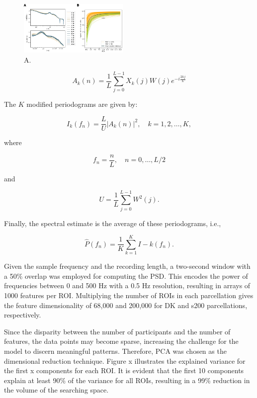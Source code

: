 \documentclass{cys}
\begin{document}
\begin{figure}[H]
\centering
	\includegraphics[width=0.47\textwidth]{PSD+PCA}
	\caption{A. }
	\label{CSD}
\end{figure}

\begin{equation}
A_k(n) = \frac{1}{L} \sum_{j=0}^{L-1}X_k(j)W(j)e^{-i{\frac{2kj}{L}}}
\end{equation} 


\smallskip
The $K$ modified periodograms are given by:

\begin{equation}
I_k(f_n)=\frac{L}{U}|A_k(n)|^2, \quad k=1,2,\ldots,K,
\end{equation} 

where

\begin{equation*}
f_n=\frac{n}{L}, \quad n=0,\ldots,L/2
\end{equation*}

and

\begin{equation*}
U=\frac{1}{L}\sum_{j=0}^{L-1} W^2(j).
\end{equation*}

\smallskip
Finally, the spectral estimate is the average of these periodograms, i.e., 


\begin{equation}
\hat{P}(f_n)=\frac{1}{K}\sum_{k=1}^K I-k(f_n).
\end{equation}


Given the sample frequency and the recording length, a two-second window with a 50\% overlap was employed for computing the PSD. This encodes the power of frequencies between 0 and 500 Hz with a 0.5 Hz resolution, resulting in arrays of 1000 features per ROI. Multiplying the number of ROIs in each parcellation gives the feature dimensionality of 68,000 and 200,000 for DK and s200 parcellations, respectively.


\bigskip
Since the disparity between the number of participants and the number of features, the data points may become sparse, increasing the challenge for the model to discern meaningful patterns. Therefore, PCA was chosen as the dimensional reduction technique. Figure x illustrates the explained variance for the first x components for each ROI. It is evident that the first 10 components explain at least 90\% of the variance for all ROIs, resulting in a 99\% reduction in the volume of the searching space.
\end{document}
